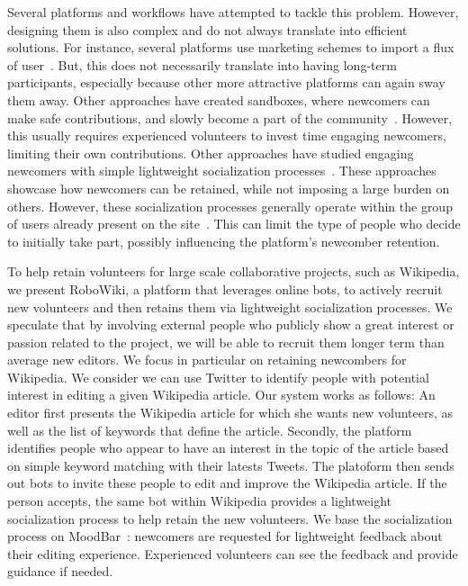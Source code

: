 \documentclass{sigchi}
\begin{document}
Several platforms and workflows have attempted to tackle this problem. However, designing them is also complex and do not always translate into efficient solutions. For instance, several platforms use marketing schemes to import a flux of user~\cite{ribeiro2014modeling}. But, this does not necessarily translate into having long-term participants, especially because other more attractive platforms can again sway them away. Other approaches have created sandboxes, where newcomers can make safe contributions, and slowly become a part of the community~\cite{morgan2013tea}. However, this usually requires experienced volunteers to invest time engaging newcomers, limiting their own contributions. 
Other approaches have studied engaging newcomers with simple lightweight socialization processes~\cite{ciampaglia2015moodbar}. These approaches showcase how newcomers can be retained, while not imposing a large burden on others. However, these socialization processes generally operate within the group of users already present on the site~\cite{halfaker2013making}. This can limit the type of people who decide to initially take part, possibly influencing the platform's newcomber retention.


To help retain volunteers for large scale collaborative projects, such as Wikipedia, we present RoboWiki, a platform that leverages online bots, to actively recruit  new volunteers and then retains them via lightweight socialization processes. We speculate that by involving external people who publicly show a great interest or passion related to the project, we will be able to recruit them longer term than average new editors. We focus in particular on retaining newcombers for Wikipedia. We consider we can use Twitter to identify people with potential interest in editing a given Wikipedia article.  
Our system works as follows: An editor first presents the Wikipedia article for which she wants new volunteers, as well as the list of keywords that define the article. Secondly, the platform identifies people who appear to have an interest in the topic of the article based on simple keyword matching with their latests Tweets. The platoform then sends out bots to invite these people to edit and improve the Wikipedia article. If the person accepts, the same bot within Wikipedia provides a lightweight socialization process to help retain the new volunteers. We base the socialization process on MoodBar~\cite{ciampaglia2015moodbar}: newcomers  are requested for lightweight feedback about their editing experience. Experienced volunteers can see the feedback and provide guidance if needed. 
\end{document}
